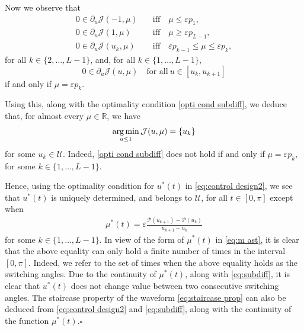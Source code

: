 \documentclass[twocolumn]{autart}    %
\begin{document}
Now we observe that
\begin{equation}\label{eq:subdiff}
	\begin{array}{ll}
		0\in \partial_u \mathcal{J} (-1,\mu) & \quad\text{iff}\quad  \mu\leq  \varepsilon p_1, 
		\\[5pt]
		0\in \partial_u \mathcal{J} (1,\mu) & \quad\text{iff} \quad \mu\geq  \varepsilon p_{L-1}, 
		\\[5pt]
		0\in \partial_u \mathcal{J} (u_k,\mu) & \quad\text{iff} \quad  \varepsilon p_{k-1} \leq \mu \leq \varepsilon p_k , 
	\end{array} 
\end{equation}
for all $k\in \{ 2, \ldots, L-1\}$,  and, for all $k\in \{ 1, \ldots, L-1 \}$,
\begin{equation*}
	0\in \partial_u \mathcal{J} (u,\mu) \quad \text{for all}\  u\in [u_k, u_{k+1}]
\end{equation*}
if and only if $\mu= \varepsilon p_k$.

Using this, along with the optimality condition \eqref{opti cond subdiff}, we deduce that, for almost every $\mu\in \mathbb{R}$, we have
\begin{align*}
	\operatorname*{arg\,min}_{u\leq 1} \mathcal{J} (u,\mu) = \{u_k\}
\end{align*}
for some $u_k\in \mathcal{U}$. Indeed, \eqref{opti cond subdiff} does not hold if and only if $\mu= \varepsilon p_k$, for some $k\in \{1,\ldots, L-1\}$.

Hence, using the optimality condition for $u^\ast(t)$ in \eqref{eq:control design2}, we see that $u^\ast(t)$ is uniquely determined, and belongs to $\mathcal{U}$, for all $t\in [0,\pi]$ except when
\begin{align*}
	\mu^\ast(t) = \varepsilon \frac{\mathcal{P}(u_{k+1}) - \mathcal{P}(u_k)}{u_{k+1} -u_k}
\end{align*} 
for some $k\in\{1,\ldots, L-1\}$. In view of the form of $\mu^\ast(t)$ in \eqref{eq:m ast}, it is clear that the above equality can only hold a finite number of times in the interval $[0,\pi]$. Indeed, we refer to the set of times when the above equality holds as the switching angles.
Due to the continuity of $\mu^\ast(t)$, along with \eqref{eq:subdiff}, it is clear that $u^\ast(t)$ does not change value between two consecutive switching angles. The staircase property of the waveform \eqref{eq:staircase prop} can also be deduced from \eqref{eq:control design2} and \eqref{eq:subdiff}, along with the continuity of the function $\mu^\ast(t)$.\hfill $\square$
\end{document}
